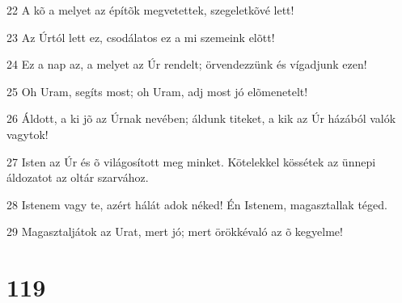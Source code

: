 \par 22 A kõ a melyet az építõk megvetettek, szegeletkõvé lett!
\par 23 Az Úrtól lett ez, csodálatos ez a mi szemeink elõtt!
\par 24 Ez a nap az, a melyet az Úr rendelt; örvendezzünk és vígadjunk ezen!
\par 25 Oh Uram, segíts most; oh Uram, adj most jó elõmenetelt!
\par 26 Áldott, a ki jõ az Úrnak nevében; áldunk titeket, a kik az Úr házából valók vagytok!
\par 27 Isten az Úr és õ világosított meg minket. Kötelekkel kössétek az ünnepi áldozatot az oltár szarvához.
\par 28 Istenem vagy te, azért hálát adok néked! Én Istenem, magasztallak téged.
\par 29 Magasztaljátok az Urat, mert jó; mert örökkévaló az õ kegyelme!

\chapter{119}

